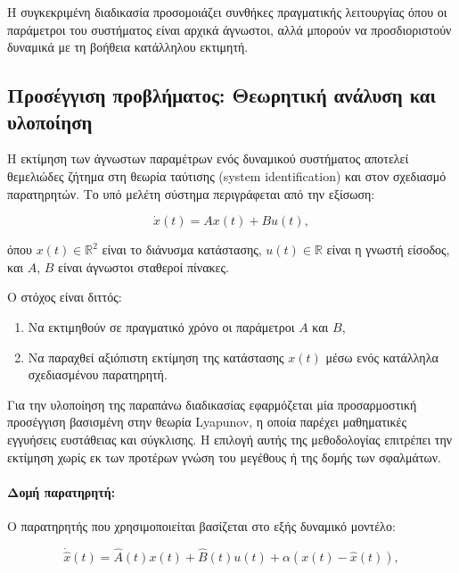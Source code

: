\documentclass[a4paper,12pt]{report}
\newcommand{\en}{\selectlanguage{english}}
\newcommand{\gr}{\selectlanguage{greek}}
\begin{document}
\hspace{-0.6cm}Η συγκεκριμένη διαδικασία προσομοιάζει συνθήκες πραγματικής λειτουργίας όπου οι παράμετροι του συστήματος είναι αρχικά άγνωστοι, αλλά μπορούν να προσδιοριστούν δυναμικά με τη βοήθεια κατάλληλου εκτιμητή.

\subsection{Προσέγγιση προβλήματος: Θεωρητική ανάλυση και υλοποίηση}

Η εκτίμηση των άγνωστων παραμέτρων ενός δυναμικού συστήματος αποτελεί θεμελιώδες ζήτημα στη θεωρία ταύτισης \en (system identification) \gr και στον σχεδιασμό παρατηρητών. Το υπό μελέτη σύστημα περιγράφεται από την εξίσωση:

\[
\dot{x}(t) = A x(t) + B u(t),
\]

\hspace{-0.6cm}όπου $x(t) \in \mathbb{R}^2$ είναι το διάνυσμα κατάστασης, $u(t) \in \mathbb{R}$ είναι η γνωστή είσοδος, και $A$, $B$ είναι άγνωστοι σταθεροί πίνακες.

\hspace{-0.6cm}Ο στόχος είναι διττός:
\begin{enumerate}
    \item Να εκτιμηθούν σε πραγματικό χρόνο οι παράμετροι $A$ και $B$,
    \item Να παραχθεί αξιόπιστη εκτίμηση της κατάστασης $x(t)$ μέσω ενός κατάλληλα σχεδιασμένου παρατηρητή.
\end{enumerate}

\hspace{-0.6cm}Για την υλοποίηση της παραπάνω διαδικασίας εφαρμόζεται μία προσαρμοστική προσέγγιση βασισμένη στην θεωρία \en Lyapunov\gr, η οποία παρέχει μαθηματικές εγγυήσεις ευστάθειας και σύγκλισης. Η επιλογή αυτής της μεθοδολογίας επιτρέπει την εκτίμηση χωρίς εκ των προτέρων γνώση του μεγέθους ή της δομής των σφαλμάτων.

\vspace{0.2cm}

\paragraph{Δομή παρατηρητή:}

\hspace{-0.25cm}Ο παρατηρητής που χρησιμοποιείται βασίζεται στο εξής δυναμικό μοντέλο:

\[
\dot{\hat{x}}(t) = \hat{A}(t) x(t) + \hat{B}(t) u(t) + \alpha (x(t) - \hat{x}(t)),
\]
\end{document}
